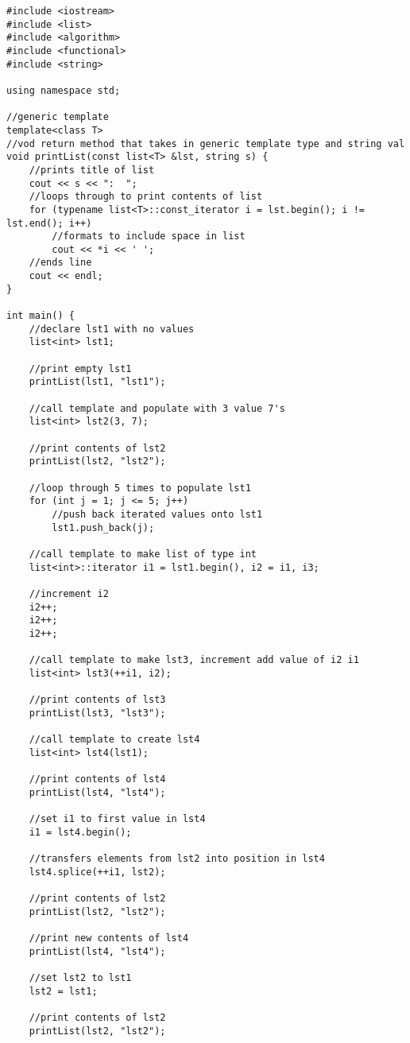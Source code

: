 \documentclass[11pt]{article}
\begin{document}
\begin{lstlisting}
#include <iostream>
#include <list>
#include <algorithm>
#include <functional>
#include <string>

using namespace std;

//generic template
template<class T>
//vod return method that takes in generic template type and string val
void printList(const list<T> &lst, string s) {
    //prints title of list
    cout << s << ":  ";
    //loops through to print contents of list
    for (typename list<T>::const_iterator i = lst.begin(); i != lst.end(); i++)
        //formats to include space in list
        cout << *i << ' ';
    //ends line
    cout << endl;
}

int main() {
    //declare lst1 with no values
    list<int> lst1;

    //print empty lst1
    printList(lst1, "lst1");

    //call template and populate with 3 value 7's
    list<int> lst2(3, 7);

    //print contents of lst2
    printList(lst2, "lst2");

    //loop through 5 times to populate lst1
    for (int j = 1; j <= 5; j++)
        //push back iterated values onto lst1
        lst1.push_back(j);

    //call template to make list of type int
    list<int>::iterator i1 = lst1.begin(), i2 = i1, i3;

    //increment i2
    i2++;
    i2++;
    i2++;

    //call template to make lst3, increment add value of i2 i1
    list<int> lst3(++i1, i2);

    //print contents of lst3
    printList(lst3, "lst3");

    //call template to create lst4
    list<int> lst4(lst1);

    //print contents of lst4
    printList(lst4, "lst4");

    //set i1 to first value in lst4
    i1 = lst4.begin();

    //transfers elements from lst2 into position in lst4
    lst4.splice(++i1, lst2);

    //print contents of lst2
    printList(lst2, "lst2");

    //print new contents of lst4
    printList(lst4, "lst4");

    //set lst2 to lst1
    lst2 = lst1;

    //print contents of lst2
    printList(lst2, "lst2");


\end{lstlisting}
\end{document}
